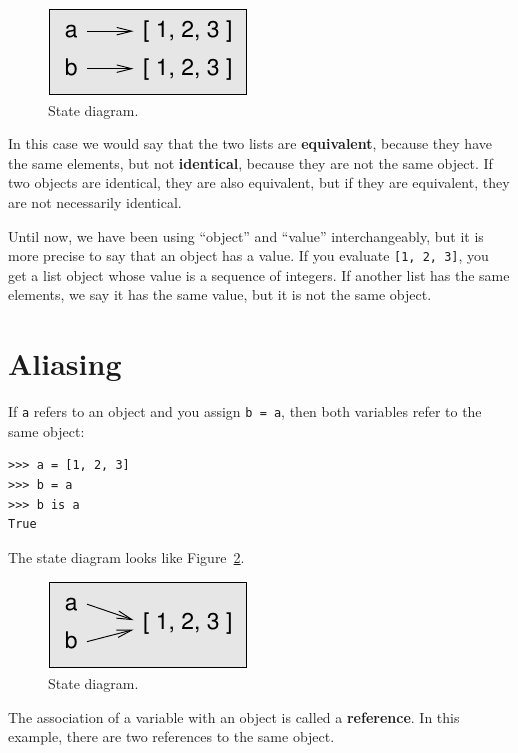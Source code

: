 \documentclass[10pt]{book}
\begin{document}
\begin{figure}
\centerline
{\includegraphics[scale=0.8]{figs/list2.pdf}}
\caption{State diagram.}
\label{fig.list2}
\end{figure}

In this case we would say that the two lists are {\bf equivalent},
because they have the same elements, but not {\bf identical}, because
they are not the same object.  If two objects are identical, they are
also equivalent, but if they are equivalent, they are not necessarily
identical.

Until now, we have been using ``object'' and ``value''
interchangeably, but it is more precise to say that an object has a
value.  If you evaluate {\tt [1, 2, 3]}, you get a list
object whose value is a sequence of integers.  If another
list has the same elements, we say it has the same value, but
it is not the same object.


\section{Aliasing}

If {\tt a} refers to an object and you assign {\tt b = a},
then both variables refer to the same object:

\begin{verbatim}
>>> a = [1, 2, 3]
>>> b = a
>>> b is a
True
\end{verbatim}
%
The state diagram looks like Figure~\ref{fig.list3}.

\begin{figure}
\centerline
{\includegraphics[scale=0.8]{figs/list3.pdf}}
\caption{State diagram.}
\label{fig.list3}
\end{figure}

The association of a variable with an object is called a {\bf
reference}.  In this example, there are two references to the same
object.
\end{document}
